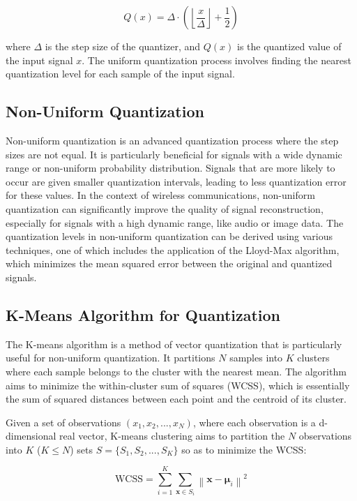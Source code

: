 \documentclass[11pt]{article}
\begin{document}
\begin{equation}
Q(x) = \Delta \cdot \left( \left\lfloor \frac{x}{\Delta} \right\rfloor + \frac{1}{2} \right)
\end{equation}

where \( \Delta \) is the step size of the quantizer, and \( Q(x) \) is the quantized value of the input signal \( x \). The uniform quantization process involves finding the nearest quantization level for each sample of the input signal.

\subsection{Non-Uniform Quantization}
Non-uniform quantization is an advanced quantization process where the step sizes are not equal. It is particularly beneficial for signals with a wide dynamic range or non-uniform probability distribution. Signals that are more likely to occur are given smaller quantization intervals, leading to less quantization error for these values. In the context of wireless communications, non-uniform quantization can significantly improve the quality of signal reconstruction, especially for signals with a high dynamic range, like audio or image data. The quantization levels in non-uniform quantization can be derived using various techniques, one of which includes the application of the Lloyd-Max algorithm, which minimizes the mean squared error between the original and quantized signals. 

\subsection{K-Means Algorithm for Quantization}
The K-means algorithm is a method of vector quantization that is particularly useful for non-uniform quantization. It partitions \( N \) samples into \( K \) clusters where each sample belongs to the cluster with the nearest mean. The algorithm aims to minimize the within-cluster sum of squares (WCSS), which is essentially the sum of squared distances between each point and the centroid of its cluster.

Given a set of observations \( (x_1, x_2, ..., x_N) \), where each observation is a d-dimensional real vector, K-means clustering aims to partition the \( N \) observations into \( K \) (\( K \leq N \)) sets \( S = \{S_1, S_2, ..., S_K\} \) so as to minimize the WCSS:

\begin{equation}
\text{WCSS} = \sum_{i=1}^{K} \sum_{\mathbf{x} \in S_i} \left\| \mathbf{x} - \mathbf{\mu}_i \right\|^2
\end{equation}
\end{document}
